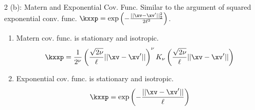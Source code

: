 \documentclass[aspectratio=169]{beamer}
\newcommand{\xvp}{\xv^\prime}
\begin{document}
\begin{frame}{2 (b): Matern and Exponential Cov. Func.}
	Similar to the argument of squared exponential conv. func. $\kxxp = \exp\left( - \frac{||\xv - \xvp||_2^2}{2 \ell^2}\right)$.
	\begin{enumerate}
		\item Matern cov. func. is stationary and isotropic.
		$$\kxxp = \frac{1}{2^\nu} \left( \frac{\sqrt{2 \nu}}{\ell} || \xv - \xvp|| \right)^\nu K_\nu \left( \frac{\sqrt{2 \nu}}{\ell} || \xv - \xvp|| \right)$$
		\item Exponential cov. func. is stationary and isotropic.
		$$\kxxp = \exp \left( - \frac{||\xv - \xvp ||}{\ell} \right)$$
	\end{enumerate}
\end{frame}
\end{document}
